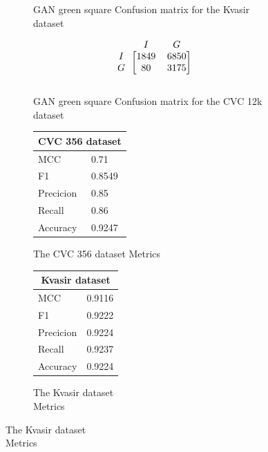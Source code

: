 \begin{figure}
\begin{subfigure}[b]{0.49\textwidth}
        
\caption{GAN green square Confusion matrix for the Kvasir dataset}
\label{mat:kvasir_CM_DN121_GAN_SQUARE}
\end{subfigure}
\begin{subfigure}[b]{0.25\textwidth}
        \[
\begin{blockarray}{ccc}
& I & G  \\
\begin{block}{c[cc]}
 		I&1849 & 6850\\
        G&  80 & 3175\\
\end{block}
\end{blockarray}
\]   
\caption{GAN green square Confusion matrix for the CVC 12k dataset}
\label{mat:cvc12k_CM_DN121_GAN_SQUARE}
\end{subfigure}
\caption{Confusion matrices for the three datasets}
\label{mat:CM_DN121_GAN_SQUARE}
\begin{subfigure}[b]{0.25\textwidth}
\begin{tabular}{ll}      
        \toprule
        \multicolumn{2}{c}{CVC 356 dataset}        \\
        \midrule
        MCC 		& 0.71 \\
        F1  		& 0.8549 \\
        Precicion  	& 0.85 \\
        Recall     	& 0.86 \\
        Accuracy	& 0.9247  \\         
        \bottomrule
        \end{tabular}
\caption{The CVC 356 dataset Metrics}
\label{tab:cvc356_metrics_DN121_GAN_SQUARE}
\end{subfigure}%
\begin{subfigure}[b]{0.49\textwidth}
    	\centering
        \begin{tabular}{ll}
        \toprule
        \multicolumn{2}{c}{Kvasir dataset}        \\
        \midrule
        MCC 		& 0.9116 \\
        F1  		& 0.9222  \\
        Precicion  	& 0.9224 \\
        Recall     	& 0.9237 \\
        Accuracy	& 0.9224 \\
        \bottomrule
\end{tabular}
\caption{The Kvasir dataset\\ Metrics}
\label{tab:kvasir_metrics_DN121_GAN_SQUARE}
\end{subfigure}%

\end{figure}
